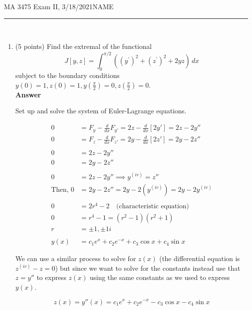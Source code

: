 \documentclass[12pt]{article}
\begin{document}
\noindent MA 3475\,\,Exam II, 3/18/2021\hfill NAME
\rule{6cm}{1pt}\\


\begin{enumerate}
\item (5 points)\,\,Find the extremal of the functional
$$
J[y,z] = \int_0^{\pi/2} \left((y^{\prime})^2 + (z^{\prime})^2 + 2y z \right) \,dx
$$
subject to the boundary conditions $y(0) = 1, z(0) = 1, y\left(\frac{\pi}{2}\right) = 0,  z\left(\frac{\pi}{2}\right) = 0$.\\

{\bf Answer}

Set up and solve the system of Euler-Lagrange equations.

\begin{align*}
0 &= F_y - \frac{d}{dx}F_{y'} = 2z - \frac{d}{dx}[2y'] = 2z - 2y'' \\
0 &= F_z - \frac{d}{dx}F_{z'} = 2y - \frac{d}{dx}[2z'] = 2y - 2z''\\
& \\
0 &= 2z-2y''\\
0 &= 2y - 2z''\\
& \\
0 &= 2z - 2y'' \implies y^{(iv)} = z''\\
\text{Then, } 0 &= 2y - 2z'' = 2y - 2(y^{(iv)}) = 2y - 2y^{(iv)}\\
& \\
0 &= 2r^4 - 2 \quad \text{(characteristic equation)}\\
0 &= r^4 - 1 = (r^2 - 1)(r^2 + 1)\\
r &= \pm 1, \pm 1 i\\
& \\
y(x) &= c_1 e^x + c_2 e^{-x} + c_3 \cos x + c_4 \sin x
\end{align*}


We can use a similar process to solve for $z(x)$ (the differential equation is $z^{(iv)} - z = 0$) but since we want to solve for the constants instead use that $z = y''$ to express $z(x)$ using the same constants as we used to express $y(x)$.


$$z(x) = y''(x) =  c_1 e^x + c_2 e^{-x} - c_3 \cos x - c_4 \sin x$$


\end{enumerate}
\end{document}
